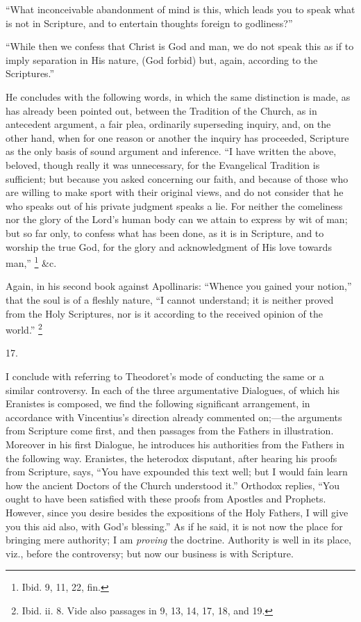 ``What inconceivable abandonment of mind is this, which leads
you to speak what is not in Scripture, and to entertain thoughts
foreign to godliness?''

``While then we confess that Christ is God and man, we do not
speak this as if to imply separation in His nature, (God forbid) but,
again, according to the Scriptures.''

He concludes with the following words, in which the same
distinction is made, as has already been pointed out, between the
Tradition of the Church, as in antecedent argument, a fair plea,
ordinarily superseding inquiry, and, on the other hand, when for one
reason or another the inquiry has proceeded, Scripture as the only
basis of sound argument and inference. ``I have written the above,
beloved, though really it was unnecessary, for the Evangelical
Tradition is sufficient; but because you asked concerning our faith,
and because of those who are willing to make sport with their original
views, and do not consider that he who speaks out of his private
judgment speaks a lie. For neither the comeliness nor the glory of the
Lord's human body can we attain to express by wit of man; but so far
only, to confess what has been done, as it is in Scripture, and to
worship the true God, for the glory and acknowledgment of His love
towards man,'' \footnote{Ibid. 9, 11, 22, fin.} \&c.

Again, in his second book against Apollinaris: ``Whence you
gained your notion,'' that the soul is of a fleshly nature,
``I cannot understand; it is neither proved from the Holy
Scriptures, nor is it according to the received opinion of the
world.'' \footnote{Ibid. ii. 8. Vide also passages in 9, 13, 14, 17, 18, and 19.}

17.

I conclude with referring to Theodoret's mode of conducting the
same or a similar controversy. In each of the three argumentative
Dialogues, of which his Eranistes is composed, we find the following
significant arrangement, in accordance with Vincentius's direction
already commented on;—the arguments from Scripture come first, and
then passages from the Fathers in illustration. Moreover in his first
Dialogue, he introduces his authorities from the Fathers in the
following way. Eranistes, the heterodox disputant, after hearing his
proofs from Scripture, says, ``You have expounded this text well;
but I would fain learn how the ancient Doctors of the Church
understood it.'' Orthodox replies, ``You ought to have been
satisfied with these proofs from Apostles and Prophets. However, since
you desire besides the expositions of the Holy Fathers, I will give
you this aid also, with God's blessing.'' As if he said, it is
not now the place for bringing mere authority; I am \emph{proving} the
doctrine. Authority is well in its place, viz., before the
controversy; but now our business is with Scripture.

